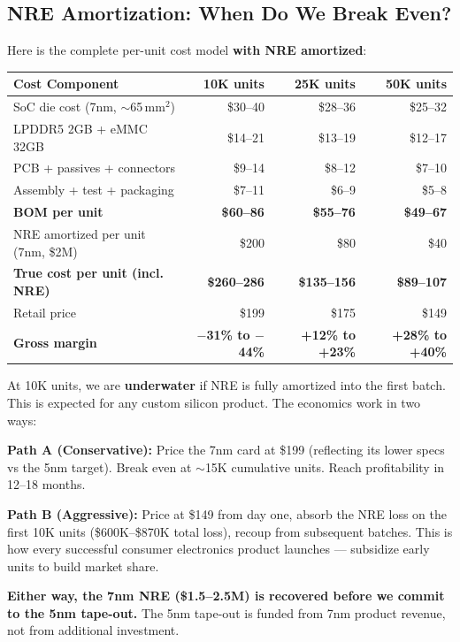 \documentclass[11pt,a4paper]{article}
\begin{document}
\subsection{NRE Amortization: When Do We Break Even?}

Here is the complete per-unit cost model \textbf{with NRE amortized}:

\begin{center}
\begin{tabular}{@{}lrrr@{}}
\toprule
\textbf{Cost Component} & \textbf{10K units} & \textbf{25K units} & \textbf{50K units} \\
\midrule
SoC die cost (7nm, $\sim$65\,mm$^2$) & \$30--40 & \$28--36 & \$25--32 \\
LPDDR5 2GB + eMMC 32GB & \$14--21 & \$13--19 & \$12--17 \\
PCB + passives + connectors & \$9--14 & \$8--12 & \$7--10 \\
Assembly + test + packaging & \$7--11 & \$6--9 & \$5--8 \\
\midrule
\textbf{BOM per unit} & \textbf{\$60--86} & \textbf{\$55--76} & \textbf{\$49--67} \\
\midrule
NRE amortized per unit (7nm, \$2M) & \$200 & \$80 & \$40 \\
\midrule
\textbf{True cost per unit (incl. NRE)} & \textbf{\$260--286} & \textbf{\$135--156} & \textbf{\$89--107} \\
\midrule
Retail price & \$199 & \$175 & \$149 \\
\textbf{Gross margin} & \textbf{$-$31\% to $-$44\%} & \textbf{+12\% to +23\%} & \textbf{+28\% to +40\%} \\
\bottomrule
\end{tabular}
\end{center}

\begin{keyinsight}
At 10K units, we are \textbf{underwater} if NRE is fully amortized into the first batch. This is expected for any custom silicon product. The economics work in two ways:

\textbf{Path A (Conservative):} Price the 7nm card at \$199 (reflecting its lower specs vs the 5nm target). Break even at $\sim$15K cumulative units. Reach profitability in 12--18 months.

\textbf{Path B (Aggressive):} Price at \$149 from day one, absorb the NRE loss on the first 10K units (\$600K--\$870K total loss), recoup from subsequent batches. This is how every successful consumer electronics product launches --- subsidize early units to build market share.

\textbf{Either way, the 7nm NRE (\$1.5--2.5M) is recovered before we commit to the 5nm tape-out.} The 5nm tape-out is funded from 7nm product revenue, not from additional investment.
\end{keyinsight}
\end{document}
